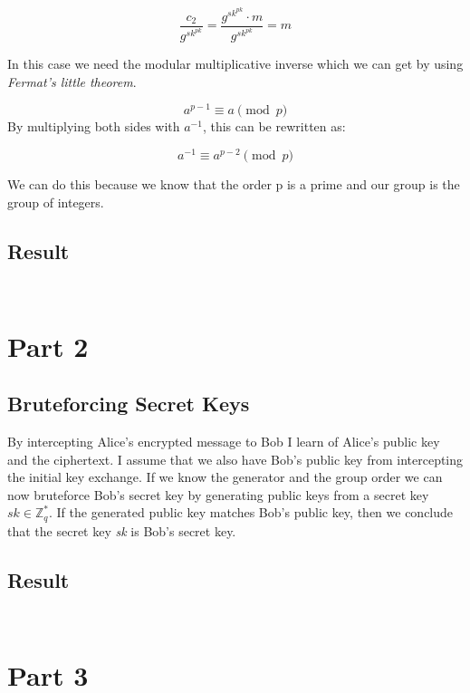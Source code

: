 \documentclass{article}
\begin{document}
\[\frac{c_2}{g^{sk^{pk}}} = \frac{g^{sk^{pk}} \cdot m}{g^{sk^{pk}}} = m\]

In this case we need the modular multiplicative inverse which we can get by using \textit{Fermat's little theorem}.

\[a^{p-1} \equiv a \pmod p\]
By multiplying both sides with \(a^{-1}\), this can be rewritten as:

\[a^{-1} \equiv a^{p-2} \pmod p\]

We can do this because we know that the order p is a prime and our group is the group of integers.


\subsection{Result}
\label{subsec:result1}

\inputminted[linenos,lastline=21]{Python}{mandatory_exercise_1.py}
\inputminted[linenos,firstline=31,lastline=41]{Python}{mandatory_exercise_1.py}



\section{Part 2}

\subsection{Bruteforcing Secret Keys}
By intercepting Alice's encrypted message to Bob I learn of Alice's public key and the ciphertext.
I assume that we also have Bob's public key from intercepting the initial key exchange.
If we know the generator and the group order we can now bruteforce Bob's secret key by generating public keys from a secret key \(sk \in \mathbb{Z}^{*}_q\). If the generated public key matches Bob's public key, then we conclude that the secret key \textit{sk} is Bob's secret key.


\subsection{Result}
\label{subsec:result2}

\inputminted[linenos,firstline=22,lastline=28]{Python}{mandatory_exercise_1.py}
\inputminted[linenos,firstline=43,lastline=52]{Python}{mandatory_exercise_1.py}

\newpage

\section{Part 3}
\end{document}
